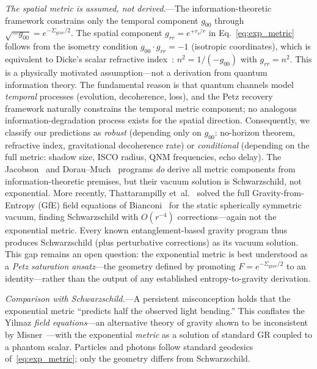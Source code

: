 \documentclass[prl,twocolumn,superscriptaddress,longbibliography,floatfix]{revtex4-2}
\newcommand{\rs}{r_{\mathrm{s}}}
\newcommand{\Sgrav}{\Sigma_{\mathrm{grav}}}
\begin{document}
\emph{The spatial metric is assumed, not derived.}---The
information-theoretic framework constrains only the temporal
component $g_{00}$ through $\sqrt{-g_{00}} = e^{-\Sgrav/2}$.
The spatial component $g_{rr} = e^{+\rs/r}$ in
Eq.~\eqref{eq:exp_metric} follows from the isometry condition
$g_{00}\cdot g_{rr} = -1$ (isotropic coordinates), which is
equivalent to Dicke's scalar refractive
index~\cite{Dicke1957}: $n^2 = 1/(-g_{00})$ with $g_{rr} = n^2$.
This is a physically motivated assumption---not a derivation from
quantum information theory.
The fundamental reason is that quantum channels model
\emph{temporal} processes (evolution, decoherence, loss),
and the Petz recovery framework naturally constrains the
temporal metric component; no analogous information-degradation
process exists for the spatial direction.
Consequently, we classify our predictions as
\emph{robust} (depending only on $g_{00}$: no-horizon theorem,
refractive index, gravitational decoherence rate) or
\emph{conditional} (depending on the full metric:
shadow size, ISCO radius, QNM frequencies, echo delay).
The Jacobson~\cite{Jacobson1995} and
Dorau--Much~\cite{DorauMuch2025} programs \emph{do} derive
all metric components from information-theoretic premises,
but their vacuum solution is Schwarzschild, not exponential.
More recently, Thattarampilly et~al.~\cite{Thattarampilly2026}
solved the full Gravity-from-Entropy (GfE) field equations of
Bianconi~\cite{Bianconi2025} for the static spherically
symmetric vacuum, finding Schwarzschild with $O(r^{-4})$
corrections---again not the exponential metric.
Every known entanglement-based gravity program thus produces
Schwarzschild (plus perturbative corrections) as its vacuum
solution.
This gap remains an open question: the exponential metric is
best understood as a \emph{Petz saturation ansatz}---the
geometry defined by promoting $F = e^{-\Sgrav/2}$ to an
identity---rather than the output of any established
entropy-to-gravity derivation.

\emph{Comparison with Schwarzschild.}---A persistent
misconception holds that the exponential metric ``predicts
half the observed light bending.''
This conflates the Yilmaz \emph{field equations}---an
alternative theory of gravity shown to be inconsistent by
Misner~\cite{Misner1999}---with the exponential \emph{metric}
as a solution of standard GR coupled to a phantom scalar.
Particles and photons follow standard geodesics
of~\eqref{eq:exp_metric}; only the geometry differs from
Schwarzschild.
\end{document}
